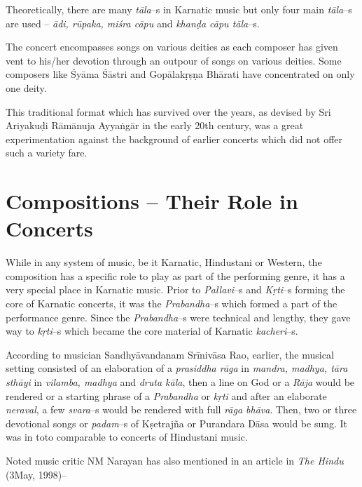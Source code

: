  \item Theoretically, there are many \textit{tāla}–s in Karnatic music but only four main \textit{tāla}–s are used – \textit{ādi, rūpaka, miśra cāpu} and \textit{khanḍa cāpu tāla}–s.

 \item The concert encompasses songs on various deities as each composer has given vent to his/her devotion through an outpour of songs on various deities. Some composers like Śyāma Śāstri and Gopālakṛṣṇa Bhārati have concentrated on only one deity.

This traditional format which has survived over the years, as devised by Sri Ariyakuḍi Rāmānuja Ayyaṅgār in the early 20th century, was a great experimentation against the background of earlier concerts which did not offer such a variety fare.


\section*{Compositions – Their Role in Concerts}

While in any system of music, be it Karnatic, Hindustani or Western, the composition has a specific role to play as part of the performing genre, it has a very special place in Karnatic music. Prior to \textit{Pallavi}–s and \textit{Kṛti}–s forming the core of Karnatic concerts, it was the \textit{Prabandha}–s which formed a part of the performance genre. Since the \textit{Prabandha}–s were technical and lengthy, they gave way to \textit{kṛti}–s which became the core material of Karnatic \textit{kacheri}–s.

According to musician Sandhyāvandanam Srīnivāsa Rao, earlier, the musical setting consisted of an elaboration of a \textit{prasiddha rāga} in \textit{mandra, madhya, tāra sthāyi} in \textit{vilamba, madhya} and \textit{druta kāla}, then a line on God or a \textit{Rāja} would be rendered or a starting phrase of a \textit{Prabandha} or \textit{kṛti} and after an elaborate \textit{neraval}, a few \textit{svara}–s would be rendered with full \textit{rāga bhāva}. Then, two or three devotional songs or \textit{padam}–s of Kṣetrajña or Purandara Dāsa would be sung. It was in toto comparable to concerts of Hindustani music.

Noted music critic NM Narayan has also mentioned in an article in \textit{The Hindu} (3May, 1998)–

